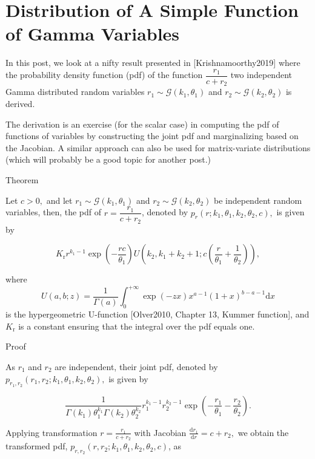 \section{Distribution of A Simple Function of Gamma Variables}

In this post, we look at a nifty result presented in [Krishnamoorthy2019] where the probability density function (pdf) of the function $\dfrac{r_1}{c+r_2}$ two independent Gamma distributed random variables $r_1 \sim \mathcal{G}(k_1,\theta_1)$ and $r_2 \sim \mathcal{G}(k_2, \theta_2)$ is derived.

The derivation is an exercise (for the scalar case) in computing the pdf of functions of variables by constructing the joint pdf and marginalizing based on the Jacobian. A similar approach can also be used for matrix-variate distributions (which will probably be a good topic for another post.)

Theorem

Let $c > 0,$ and let $r_1 \sim \mathcal{G}(k_1,\theta_1)$ and $r_2 \sim \mathcal{G}(k_2, \theta_2)$ be independent random variables, then, the pdf of $r = \dfrac{r_1}{c+r_2}$, denoted by $p_r(r;k_1,\theta_1,k_2,\theta_2,c),$ is given by

\begin{equation}K_\mathrm{r} r^{k_1-1} \exp\left(-\frac{rc}{\theta_1}\right) U\left(k_2,k_1+k_2+1;c\left(\frac{r}{\theta_1}+\frac{1}{\theta_2}\right)\right),\end{equation}

where $$U(a,b;z) = \frac{1}{\Gamma(a)} \int_{0}^{+\infty} \exp(-zx) x^{a-1} (1+x)^{b-a-1} \mathrm{d}x$$ is the hypergeometric U-function [Olver2010, Chapter 13, Kummer function], and $K_\mathrm{r}$ is a constant ensuring that the integral over the pdf equals one.

Proof

As $r_1$ and $r_2$ are independent, their joint pdf, denoted by $p_{r_1,r_2}(r_1,r_2;k_1,\theta_1,k_2,\theta_2),$ is given by

\begin{equation}\frac{1}{\Gamma(k_1) \theta_1^{k_1} \Gamma(k_2) \theta_2^{k_2}} r_1^{k_1-1} r_2^{k_2-1} \exp\left(-\frac{r_1}{\theta_1}-\frac{r_2}{\theta_2}\right).\end{equation}

Applying transformation $r = \frac{r_1}{c+r_2}$ with Jacobian $\frac{\mathrm{d} r_1}{\mathrm{d} r} = c+r_2,$ we obtain the transformed pdf, $p_{r,r_2}(r,r_2;k_1,\theta_1,k_2,\theta_2,c)$, as

